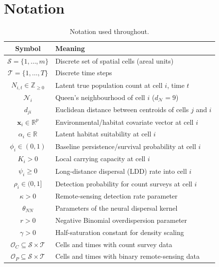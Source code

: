 \documentclass[12pt,a4paper]{article}
\theoremstyle{definition}
\newcommand{\bx}{\bm{x}}
\renewcommand{\S}{\mathcal{S}}
\newcommand{\T}{\mathcal{T}}
\newcommand{\Ni}{\mathcal{N}_i}
\newcommand{\OC}{\mathcal{O}_C}
\newcommand{\OP}{\mathcal{O}_P}
\begin{document}
\section{Notation}
\label{sec:notation}

\begin{table}[h!]
\centering
\small
\renewcommand{\arraystretch}{1.3}
\begin{tabular}{cl}
\toprule
\textbf{Symbol} & \textbf{Meaning} \\
\midrule
$\S = \{1,\ldots,m\}$ & Discrete set of spatial cells (areal units) \\
$\T = \{1,\ldots,T\}$ & Discrete time steps \\
$N_{i,t} \in \mathbb{Z}_{\geq 0}$ & Latent true population count at cell $i$, time $t$ \\
$\Ni$ & Queen's neighbourhood of cell $i$ ($d_\mathcal{N}=9$) \\
$d_{ji}$ & Euclidean distance between centroids of cells $j$ and $i$ \\
$\bx_i \in \mathbb{R}^p$ & Environmental/habitat covariate vector at cell $i$ \\
$\alpha_i \in \mathbb{R}$ & Latent habitat suitability at cell $i$ \\
$\phi_i \in (0,1)$ & Baseline persistence/survival probability at cell $i$ \\
$K_i > 0$ & Local carrying capacity at cell $i$ \\
$\psi_i \geq 0$ & Long-distance dispersal (LDD) rate into cell $i$ \\
$\rho_i \in (0,1]$ & Detection probability for count surveys at cell $i$ \\
$\kappa > 0$ & Remote-sensing detection rate parameter \\
$\theta_{NN}$ & Parameters of the neural dispersal kernel \\
$r > 0$ & Negative Binomial overdispersion parameter \\
$\gamma > 0$ & Half-saturation constant for density scaling \\
$\OC \subseteq \S\times\T$ & Cells and times with count survey data \\
$\OP \subseteq \S\times\T$ & Cells and times with binary remote-sensing data \\
\bottomrule
\end{tabular}
\caption{Notation used throughout.}
\label{tab:notation}
\end{table}
\end{document}
